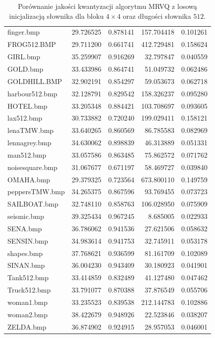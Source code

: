 \documentclass{article}
\begin{document}
\begin{table}[ht]
\begin{tabular}{@{}lrrrr@{}}
        finger.bmp &  29.726525 &  0.878141 &  157.704418 &  0.101261 \\
       FROG512.BMP &  29.711200 &  0.661741 &  412.729481 &  0.158624 \\
          GIRL.bmp &  35.259907 &  0.916269 &   32.797847 &  0.040559 \\
          GOLD.bmp &  33.433986 &  0.864741 &   51.049732 &  0.062486 \\
      GOLDHILL.BMP &  32.902191 &  0.854297 &   59.053673 &  0.062718 \\
    harbour512.bmp &  32.128791 &  0.829542 &  158.326237 &  0.095280 \\
         HOTEL.bmp &  33.205348 &  0.884421 &  103.708697 &  0.093605 \\
        lax512.bmp &  30.733882 &  0.720240 &  199.029411 &  0.158121 \\
       lenaTMW.bmp &  33.640265 &  0.860569 &   86.785583 &  0.082969 \\
     lennagrey.bmp &  34.630062 &  0.898839 &   46.313889 &  0.051331 \\
        man512.bmp &  33.057586 &  0.863485 &   75.862572 &  0.071762 \\
   noisesquare.bmp &  31.067677 &  0.671197 &   58.469727 &  0.039840 \\
         OMAHA.bmp &  29.379325 &  0.723564 &  673.800110 &  0.149759 \\
    peppersTMW.bmp &  34.265375 &  0.867596 &   93.769455 &  0.073723 \\
      SAILBOAT.bmp &  32.748110 &  0.858763 &  106.028950 &  0.075909 \\
       seismic.bmp &  39.325434 &  0.967245 &    8.685005 &  0.022933 \\
          SENA.bmp &  36.786062 &  0.941536 &   27.621506 &  0.058632 \\
        SENSIN.bmp &  34.983614 &  0.941753 &   32.745911 &  0.053178 \\
        shapes.bmp &  37.768621 &  0.936599 &   81.161709 &  0.102089 \\
         SINAN.bmp &  36.004230 &  0.943409 &   30.180923 &  0.041901 \\
       Tank512.bmp &  33.414859 &  0.832489 &   41.127480 &  0.047462 \\
      Truck512.bmp &  33.791077 &  0.870388 &   37.876549 &  0.055706 \\
        woman1.bmp &  33.235523 &  0.839538 &  212.144783 &  0.102886 \\
        woman2.bmp &  38.422679 &  0.948926 &   22.523846 &  0.038207 \\
         ZELDA.bmp &  36.874902 &  0.924915 &   28.957053 &  0.046001 \\
\bottomrule

\end{tabular}
\caption{Porównanie jakości kwantyzacji algorytmu MRVQ z losową inicjalizacją słownika dla bloku $4 \times 4$ oraz długości słownika $512$.}
\label{tab:mrvq_random}
\end{table}
\end{document}
